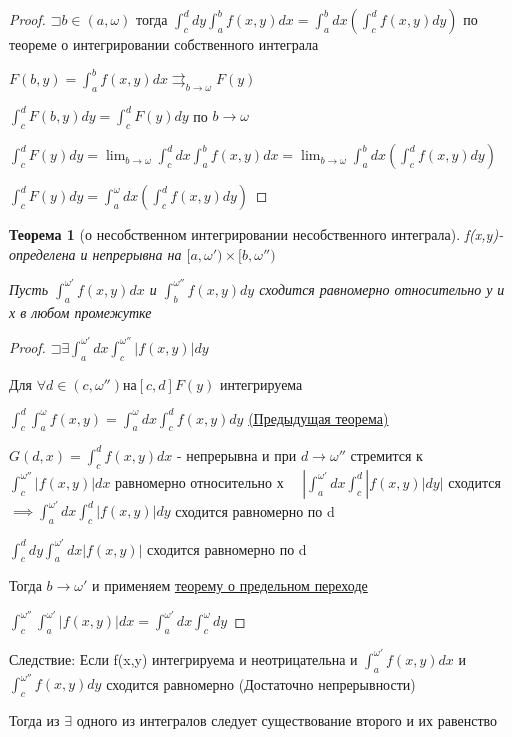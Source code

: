 \documentclass[a4paper, 12pt]{article}
\newcommand\letsymbol{\mathord{\sqsupset}}
\newtheorem{theorem}{Теорема}[section]
\theoremstyle{definition}
\theoremstyle{remark}
\begin{document}
\begin{proof}
     $\letsymbol{}b \in (a, \omega)$ тогда $\int_c^d dy \int_a^b f(x,y)dx = \int_a^b dx (\int_c^d f(x,y)dy)$
     по теореме о интегрировании собственного интеграла

     $F(b, y) = \int_a^b f(x,y)dx\rightrightarrows_{b\to\omega} F(y)$

     $\int_c^d F(b,y)dy = \int_c^d F(y)dy $ по $b\to\omega$

     $\int_c^d F(y)dy = \lim_{b\to\omega} \int_c^d dx\int_a^b f(x,y)dx = \lim_{b\to\omega}\int_a^b dx(\int_c^d f(x,y)dy)$

     $\int_c^d F(y)dy = \int_a^\omega dx (\int_c^d f(x,y)dy)$
\end{proof}

\begin{theorem}[о несобственном интегрировании несобственного интеграла]
     f(x,y)- определена и непрерывна на $[a,\omega')\times[b, \omega'')$

     Пусть $\int_a^{\omega'} f(x,y)dx$ и $\int_b^{\omega''} f(x,y)dy$ сходится равномерно относительно у и х в любом промежутке
\end{theorem}
\begin{proof}
     $\letsymbol{} \exists \int_a^{\omega'}dx\int_c^{\omega''}|f(x,y)|dy$

     Для $\forall d\in (c, \omega'') на [c,d] F(y)$ интегрируема

     $\int_c^d\int_a^\omega f(x,y) = \int_a^\omega dx \int_c^d f(x,y)dy$  \hyperlink{p3}{(Предыдущая теорема)}

     $G(d,x) = \int_c^d f(x,y)dx$ - непрерывна и при $d\to\omega''$ стремится к
     $\int_c^{\omega''}| f(x,y)|dx$ равномерно относительно х 
     $\quad|\int_a^{\omega'}dx \int_c^d|f(x,y)|dy|$ сходится $\implies \int_a^{\omega'}dx \int_c^d|f(x,y)|dy$ сходится равномерно по d

     $\int_c^d dy \int_a^{\omega'}dx |f(x,y)|$ сходится равномерно по d

     Тогда $b\to\omega' $ и применяем \hyperlink{p4}{теорему о предельном переходе}

     $\int_c^{\omega''}\int_a^{\omega'}|f(x,y)|dx = \int_a^{\omega'}dx\int_c^{\omega}dy$
\end{proof}

Следствие: Если f(x,y) интегрируема и неотрицательна и $\int_a^{\omega'}f(x,y)dx$ и $\int_c^{\omega''}f(x,y)dy$ сходится равномерно (Достаточно непрерывности)

Тогда из $\exists$ одного из интегралов следует существование второго и их равенство
\end{document}
